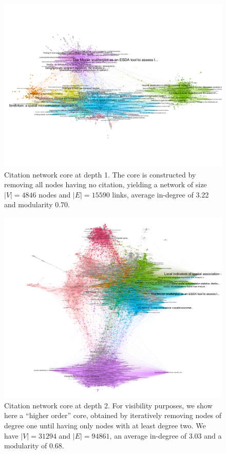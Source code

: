 \begin{figure}
  \includegraphics[width=\linewidth]{figures/microsim_depth1.png}
  \caption{Citation network core at depth 1. The core is constructed by removing all nodes having no citation, yielding a network of size $\left|V\right|=4846$ nodes and $\left|E\right|=15590$ links, average in-degree of 3.22 and modularity 0.70.}
  \label{fig:citnwdepth1}
\end{figure}

\begin{figure}
  \includegraphics[width=\linewidth]{figures/microsim_depth2_corehigher.png}
  \caption{Citation network core at depth 2. For visibility purposes, we show here a ``higher order'' core, obtained by iteratively removing nodes of degree one until having only nodes with at least degree two. We have $\left|V\right|=31294$ and $\left|E\right|=94861$, an average in-degree of 3.03 and a modularity of 0.68.}
  \label{fig:citnwdepth2}
\end{figure}





